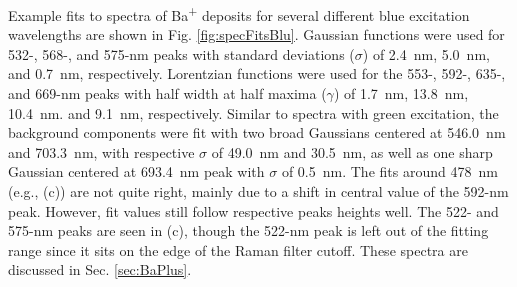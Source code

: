 Example fits to spectra of Ba\textsuperscript{+} deposits for several different blue excitation wavelengths are shown in Fig. \ref{fig:specFitsBlu}.  Gaussian functions were used for 532-, 568-, and 575-nm peaks with standard deviations ($\sigma$) of 2.4~nm, 5.0~nm, and 0.7~nm, respectively.  Lorentzian functions were used for the 553-, 592-, 635-, and 669-nm peaks with half width at half maxima ($\gamma$) of 1.7~nm, 13.8~nm, 10.4~nm. and 9.1~nm, respectively.  Similar to spectra with green excitation, the background components were fit with two broad Gaussians centered at 546.0~nm and 703.3~nm, with respective $\sigma$ of 49.0~nm and 30.5~nm, as well as one sharp Gaussian centered at 693.4~nm peak with $\sigma$ of 0.5~nm.  The fits around 478~nm (e.g., (c)) are not quite right, mainly due to a shift in central value of the 592-nm peak.  However, fit values still follow respective peaks heights well.  The 522- and 575-nm peaks are seen in (c), though the 522-nm peak is left out of the fitting range since it sits on the edge of the Raman filter cutoff.   These spectra are discussed in Sec. \ref{sec:BaPlus}.


